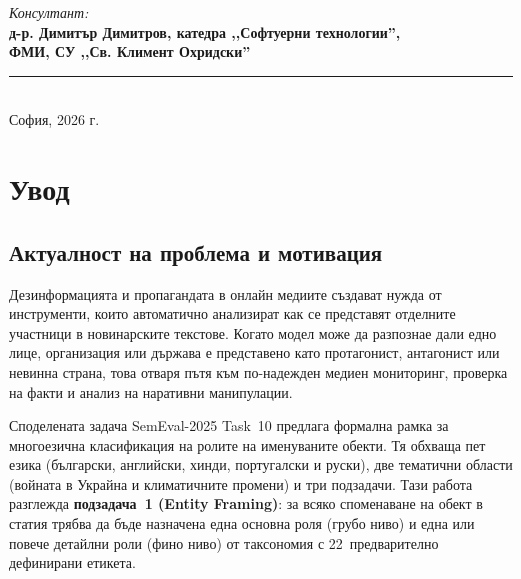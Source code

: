 \documentclass[12pt,a4paper]{report}
\begin{document}
\begin{titlepage}
\begin{center}
\begin{flushright}
\vspace{0.8cm}

\textit{Консултант:}\\[6pt]
\textbf{д-р. Димитър Димитров, катедра ,,Софтуерни технологии'',}\\
\textbf{ФМИ, СУ ,,Св. Климент Охридски''}
\end{flushright}

\vfill

\rule{\textwidth}{0.5pt}\\[8pt]
{\large София, 2026 г.}

\end{center}
\end{titlepage}

\setcounter{tocdepth}{2}
\tableofcontents
\newpage


\chapter{Увод}

\section{Актуалност на проблема и мотивация}

Дезинформацията и пропагандата в онлайн медиите създават нужда от инструменти, които автоматично анализират как се представят отделните участници в новинарските текстове. Когато модел може да разпознае дали едно лице, организация или държава е представено като протагонист, антагонист или невинна страна, това отваря пътя към по-надежден медиен мониторинг, проверка на факти и анализ на наративни манипулации.

Споделената задача SemEval-2025 Task~10 \cite{piskorski2025semeval} предлага формална рамка за многоезична класификация на ролите на именуваните обекти. Тя обхваща пет езика (български, английски, хинди, португалски и руски), две тематични области (войната в Украйна и климатичните промени) и три подзадачи. Тази работа разглежда \textbf{подзадача~1 (Entity Framing)}: за всяко споменаване на обект в статия трябва да бъде назначена една основна роля (грубо ниво) и една или повече детайлни роли (фино ниво) от таксономия с 22~предварително дефинирани етикета.
\end{document}

